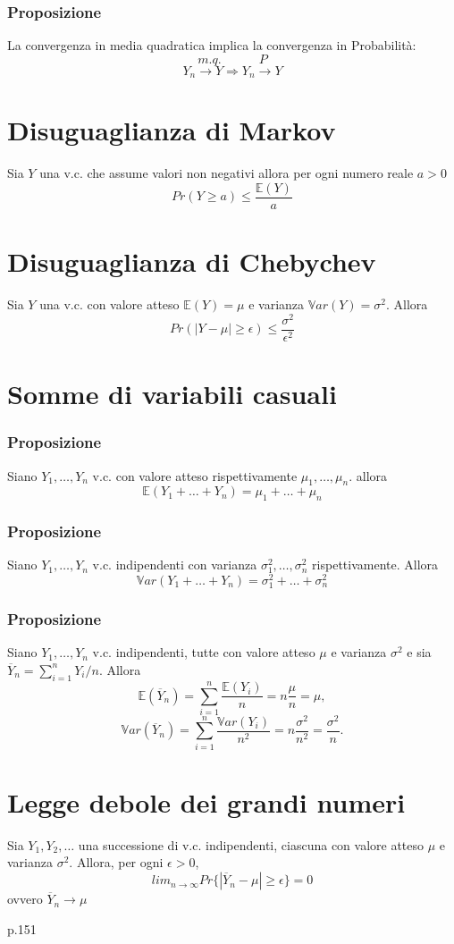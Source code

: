 \documentclass[a4paper]{report}
\begin{document}
  \subsubsection{Proposizione}
  La convergenza in media quadratica implica la convergenza in Probabilità:
  \[ m.q. \quad \quad \quad P\]
  \[ Y_n \rightarrow Y \Rightarrow Y_n \rightarrow Y \]

  \section{Disuguaglianza di Markov}
  Sia $Y$ una v.c. che assume valori non negativi allora per ogni numero reale $a>0$
  \[ Pr(Y \geq a) \leqslant \frac{\mathbb{E}(Y)}{a} \]

  \section{Disuguaglianza di Chebychev}
  Sia $Y$ una v.c. con valore atteso $\mathbb{E}(Y) = \mu$ e varianza $\mathbb{V}ar(Y) = \sigma^2$. Allora
  \[ Pr(|Y-\mu| \geq \epsilon) \leqslant \frac{\sigma^2}{\epsilon^2} \]

  \section{Somme di variabili casuali}
  \subsubsection{Proposizione}
  Siano $Y_1,\dots,Y_n$ v.c. con valore atteso rispettivamente $\mu_1,\dots,\mu_n$. allora
  \[ \mathbb{E}(Y_1 + \dots + Y_n) = \mu_1 + \dots + \mu_n \]

  \subsubsection{Proposizione}
  Siano $Y_1,\dots,Y_n$ v.c. indipendenti con varianza $\sigma_1^2, \dots, \sigma_n^2$ rispettivamente. Allora
  \[ \mathbb{V}ar(Y_1 + \dots + Y_n) = \sigma_1^2 + \dots + \sigma_n^2 \]

  \subsubsection{Proposizione}
  Siano $Y_1,\dots,Y_n$ v.c. indipendenti, tutte con valore atteso $\mu$ e varianza $\sigma^2$ e sia $\overline{Y}_n = \sum_{i = 1}^n Y_i/n.$ Allora
  \[ \mathbb{E}(\overline{Y}_n) = \sum_{i = 1}^n \frac{\mathbb{E}(Y_i)}{n} = n\frac{\mu}{n}= \mu,\]
  \[ \mathbb{V}ar(\overline{Y}_n)= \sum_{i=1}^n \frac{\mathbb{V}ar(Y_i)}{n^2} = n\frac{\sigma^2}{n^2} = \frac{\sigma^2}{n}. \]

  \section{Legge debole dei grandi numeri}
  Sia $Y_1, Y_2, \dots$ una successione di v.c. indipendenti, ciascuna con valore atteso $\mu$ e varianza $\sigma^2$. Allora, per ogni $\epsilon > 0$,
  \[ lim_{n \to \infty} Pr\{ |\overline{Y}_n -\mu| \geq \epsilon \} = 0 \]
  ovvero $\overline{Y}_n \rightarrow \mu$

  p.151
\end{document}
